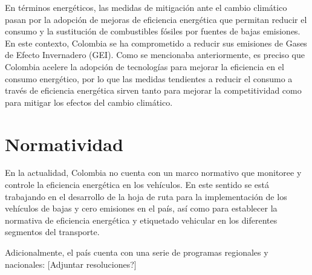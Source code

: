 En términos energéticos, las medidas de mitigación ante el cambio climático pasan por la adopción de mejoras de eficiencia energética que permitan reducir el consumo y la sustitución de combustibles fósiles por fuentes de bajas emisiones. En este contexto, Colombia se ha comprometido a reducir sus emisiones de Gases de Efecto Invernadero (GEI). \cite{Plan_Energetico-2050} Como se mencionaba anteriormente, es preciso que Colombia acelere la adopción de tecnologías para mejorar la eficiencia en el consumo energético, por lo que las medidas tendientes a reducir el consumo a través de eficiencia energética sirven tanto para mejorar la competitividad como para mitigar los efectos del cambio climático.



\section{Normatividad}

En la actualidad, Colombia no cuenta con un marco normativo que monitoree y controle la eficiencia energética en los vehículos. En este sentido se está trabajando en el desarrollo de la hoja de ruta para la implementación de los vehículos de bajas y cero emisiones en el país, así como para establecer la normativa de eficiencia energética y etiquetado vehicular en los diferentes segmentos del transporte. \cite{Baseline_Pereira_2020}

Adicionalmente, el país cuenta con una serie de programas regionales y nacionales: \label{Comentario}[Adjuntar resoluciones?]

